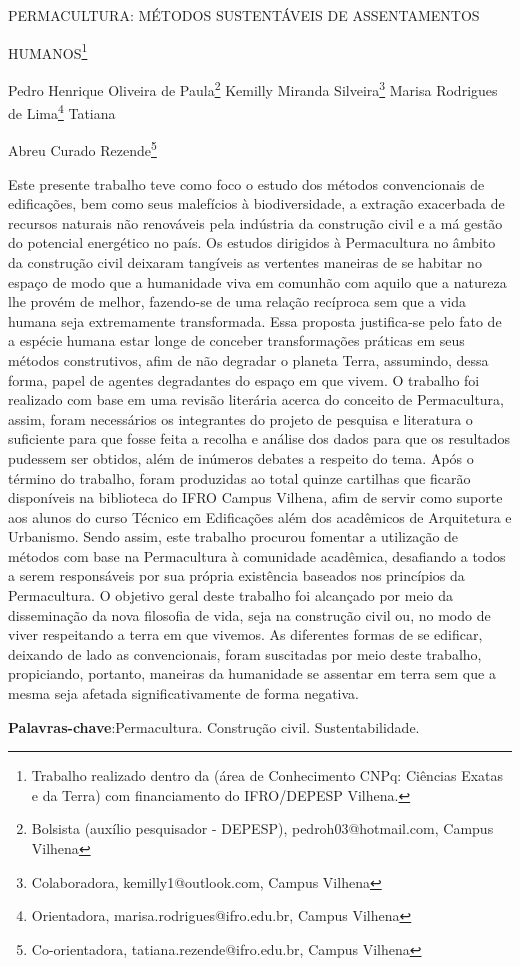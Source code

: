 \documentclass[article,12pt,onesidea,4paper,english,brazil]{abntex2}
\begin{document}
	
	
	\frenchspacing 
	
	\begin{center}
		\LARGE PERMACULTURA: MÉTODOS SUSTENTÁVEIS DE ASSENTAMENTOS
		
		HUMANOS\footnote{Trabalho realizado dentro da (área de Conhecimento CNPq: Ciências Exatas e da Terra) com
			financiamento do IFRO/DEPESP Vilhena.}
		
		\normalsize
		Pedro Henrique Oliveira de Paula\footnote{Bolsista (auxílio pesquisador - DEPESP), pedroh03@hotmail.com, Campus Vilhena} 
		Kemilly Miranda Silveira\footnote{Colaboradora, kemilly1@outlook.com, Campus Vilhena} 
		Marisa Rodrigues de Lima\footnote{Orientadora, marisa.rodrigues@ifro.edu.br, Campus Vilhena} 
		Tatiana
		
		Abreu Curado Rezende\footnote{Co-orientadora, tatiana.rezende@ifro.edu.br, Campus Vilhena}
		 
	\end{center}
	
	\noindent Este presente trabalho teve como foco o estudo dos métodos convencionais de
	edificações, bem como seus malefícios à biodiversidade, a extração exacerbada de
	recursos naturais não renováveis pela indústria da construção civil e a má gestão do
	potencial energético no país. Os estudos dirigidos à Permacultura no âmbito da
	construção civil deixaram tangíveis as vertentes maneiras de se habitar no espaço
	de modo que a humanidade viva em comunhão com aquilo que a natureza lhe
	provém de melhor, fazendo-se de uma relação recíproca sem que a vida humana
	seja extremamente transformada. Essa proposta justifica-se pelo fato de a espécie
	humana estar longe de conceber transformações práticas em seus métodos
	construtivos, afim de não degradar o planeta Terra, assumindo, dessa forma, papel
	de agentes degradantes do espaço em que vivem. O trabalho foi realizado com base
	em uma revisão literária acerca do conceito de Permacultura, assim, foram
	necessários os integrantes do projeto de pesquisa e literatura o suficiente para que
	fosse feita a recolha e análise dos dados para que os resultados pudessem ser
	obtidos, além de inúmeros debates a respeito do tema. Após o término do trabalho,
	foram produzidas ao total quinze cartilhas que ficarão disponíveis na biblioteca do
	IFRO Campus Vilhena, afim de servir como suporte aos alunos do curso Técnico em
	Edificações além dos acadêmicos de Arquitetura e Urbanismo. Sendo assim, este
	trabalho procurou fomentar a utilização de métodos com base na Permacultura à
	comunidade acadêmica, desafiando a todos a serem responsáveis por sua própria
	existência baseados nos princípios da Permacultura. O objetivo geral deste trabalho
	foi alcançado por meio da disseminação da nova filosofia de vida, seja na
	construção civil ou, no modo de viver respeitando a terra em que vivemos. As
	diferentes formas de se edificar, deixando de lado as convencionais, foram
	suscitadas por meio deste trabalho, propiciando, portanto, maneiras da humanidade
	se assentar em terra sem que a mesma seja afetada significativamente de forma
	negativa.
	
	\vspace{\onelineskip}
	
	\noindent
	\textbf{Palavras-chave}:Permacultura. Construção civil. Sustentabilidade.
	
\end{document}
